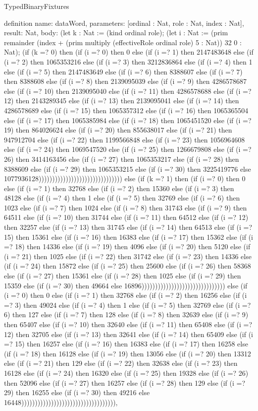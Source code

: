 \begin{lexlean}{TypedBinaryFixtures}
\begin{semanticmodule}
definition{
  name: dataWord,
  parameters: [ordinal : Nat, role : Nat, index : Nat],
  result: Nat,
  body: (let k : Nat := (kind ordinal role); (let i : Nat := (prim remainder (index + (prim multiply (effectiveRole ordinal role) 5 : Nat)) 32 0 : Nat); (if (k =? 0) then (if (i =? 0) then 0 else (if (i =? 1) then 2147483648 else (if (i =? 2) then 1065353216 else (if (i =? 3) then 3212836864 else (if (i =? 4) then 1 else (if (i =? 5) then 2147483649 else (if (i =? 6) then 8388607 else (if (i =? 7) then 8388608 else (if (i =? 8) then 2139095039 else (if (i =? 9) then 4286578687 else (if (i =? 10) then 2139095040 else (if (i =? 11) then 4286578688 else (if (i =? 12) then 2143289345 else (if (i =? 13) then 2139095041 else (if (i =? 14) then 4286578689 else (if (i =? 15) then 1065357312 else (if (i =? 16) then 1065365504 else (if (i =? 17) then 1065385984 else (if (i =? 18) then 1065451520 else (if (i =? 19) then 864026624 else (if (i =? 20) then 855638017 else (if (i =? 21) then 947912704 else (if (i =? 22) then 1199566848 else (if (i =? 23) then 1056964608 else (if (i =? 24) then 1069547520 else (if (i =? 25) then 1266679808 else (if (i =? 26) then 3414163456 else (if (i =? 27) then 1065353217 else (if (i =? 28) then 8388609 else (if (i =? 29) then 1065353215 else (if (i =? 30) then 3225419776 else 1077936128))))))))))))))))))))))))))))))) else (if (k =? 1) then (if (i =? 0) then 0 else (if (i =? 1) then 32768 else (if (i =? 2) then 15360 else (if (i =? 3) then 48128 else (if (i =? 4) then 1 else (if (i =? 5) then 32769 else (if (i =? 6) then 1023 else (if (i =? 7) then 1024 else (if (i =? 8) then 31743 else (if (i =? 9) then 64511 else (if (i =? 10) then 31744 else (if (i =? 11) then 64512 else (if (i =? 12) then 32257 else (if (i =? 13) then 31745 else (if (i =? 14) then 64513 else (if (i =? 15) then 15361 else (if (i =? 16) then 16383 else (if (i =? 17) then 15362 else (if (i =? 18) then 14336 else (if (i =? 19) then 4096 else (if (i =? 20) then 5120 else (if (i =? 21) then 1025 else (if (i =? 22) then 31742 else (if (i =? 23) then 14336 else (if (i =? 24) then 15872 else (if (i =? 25) then 25600 else (if (i =? 26) then 58368 else (if (i =? 27) then 15361 else (if (i =? 28) then 1025 else (if (i =? 29) then 15359 else (if (i =? 30) then 49664 else 16896))))))))))))))))))))))))))))))) else (if (i =? 0) then 0 else (if (i =? 1) then 32768 else (if (i =? 2) then 16256 else (if (i =? 3) then 49024 else (if (i =? 4) then 1 else (if (i =? 5) then 32769 else (if (i =? 6) then 127 else (if (i =? 7) then 128 else (if (i =? 8) then 32639 else (if (i =? 9) then 65407 else (if (i =? 10) then 32640 else (if (i =? 11) then 65408 else (if (i =? 12) then 32705 else (if (i =? 13) then 32641 else (if (i =? 14) then 65409 else (if (i =? 15) then 16257 else (if (i =? 16) then 16383 else (if (i =? 17) then 16258 else (if (i =? 18) then 16128 else (if (i =? 19) then 13056 else (if (i =? 20) then 13312 else (if (i =? 21) then 129 else (if (i =? 22) then 32638 else (if (i =? 23) then 16128 else (if (i =? 24) then 16320 else (if (i =? 25) then 19328 else (if (i =? 26) then 52096 else (if (i =? 27) then 16257 else (if (i =? 28) then 129 else (if (i =? 29) then 16255 else (if (i =? 30) then 49216 else 16448))))))))))))))))))))))))))))))))))),
}
\end{semanticmodule}
\end{lexlean}
